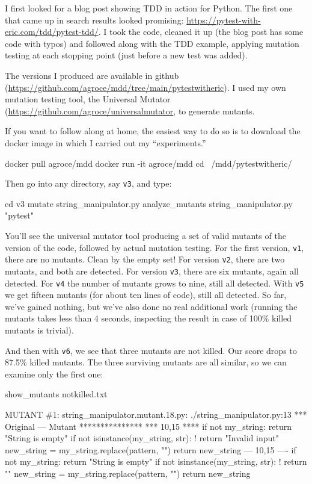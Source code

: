 \documentclass[sigplan,screen]{acmart}
\begin{document}
    I first looked for a blog post showing TDD in action for Python.
    The first one that came up in search results looked promising:
    \url{https://pytest-with-eric.com/tdd/pytest-tdd/}.  I took the
    code, cleaned it up (the blog post has some code with typos) and
    followed along with the TDD example, applying mutation testing at
    each stopping point (just before a new test was added).

    The versions I produced are available in github
    (\url{https://github.com/agroce/mdd/tree/main/pytestwitheric}).  I
    used my own mutation testing tool, the Universal
    Mutator~\cite{SyntaxUM}
    (\url{https://github.com/agroce/universalmutator}, to generate
    mutants.

    If you want to follow along at home, the easiest way to do so is
    to download the docker image in which I carried out my
    ``experiments.''

 \begin{code}
 docker pull agroce/mdd
 docker run -it agroce/mdd
 cd ~/mdd/pytestwitheric/
 \end{code}

    Then go into any directory, say {\tt v3}, and type:

 \begin{code}
 cd v3
 mutate string\_manipulator.py
 analyze\_mutants string\_manipulator.py "pytest"
\end{code}

You'll see the universal mutator tool producing a set of valid mutants
of the version of the code, followed by actual mutation testing.  For
the first version, {\tt v1}, there are no mutants.  Clean by the
empty set!  For version {\tt v2}, there are two mutants, and both are
detected.  For version {\tt v3}, there are six mutants, again all
detected. For {\tt v4} the number of mutants grows to nine, still all
detected.  With {\tt v5} we get fifteen mutants (for about ten lines
of code), still all detected.  So far, we've gained nothing, but we've
also done no real additional work (running the mutants takes less than 4
seconds, inspecting the result in case of 100\% killed mutants is trivial).

And then with {\tt v6}, we see that three mutants are not killed. Our
score drops to 87.5\% killed mutants.  The three surviving mutants are
all similar, so we can examine only the first one:

{\scriptsize
\begin{code}
show\_mutants notkilled.txt 

MUTANT \#1:
string\_manipulator.mutant.18.py: ./string\_manipulator.py:13
*** Original
--- Mutant
***************
*** 10,15 ****
          if not my\_string:  
              return "String is empty"  
          if not isinstance(my\_string, str):  
!             return "Invalid input"  
          new\_string = my\_string.replace(pattern, "")  
          return new\_string
--- 10,15 ----
          if not my\_string:  
              return "String is empty"  
          if not isinstance(my\_string, str):  
!             return ""  
          new\_string = my\_string.replace(pattern, "")  
          return new\_string
        \end{code}
      }
\end{document}
